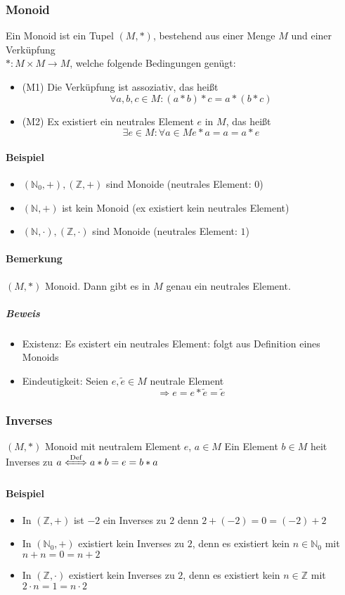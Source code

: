 \documentclass[a4paper]{scrartcl}
\DeclareMathOperator{\Forall}{\forall}
\theoremstyle{definition}
\theoremstyle{plain}
\theoremstyle{plain}
\theoremstyle{remark}
\theoremstyle{remark}
\theoremstyle{remark}
\begin{document}
\subsubsection{Monoid}
\label{sec-3-1-2}
Ein Monoid ist ein Tupel $(M,*)$, bestehend aus einer Menge $M$ und einer Verküpfung \\
    $*:M\times M \to M$, welche folgende Bedingungen genügt:
\begin{itemize}
\item (M1) Die Verküpfung ist assoziativ, das heißt \[\Forall a,b,c\in M:(a*b)*c = a*(b*c) \]
\item (M2) Ex existiert ein neutrales Element $e$ in $M$, das heißt \[\exists e\in M:\Forall a\in M e*a = a = a*e\]
\end{itemize}
\paragraph{Beispiel}
\label{sec-3-1-2-1}
\begin{itemize}
\item $(\mathbb{N}_0,+), (\mathbb{Z},+)$ sind Monoide (neutrales Element: $0$)
\item $(\mathbb{N},+)$ ist kein Monoid (ex existiert kein neutrales Element)
\item $(\mathbb{N},\cdot),(\mathbb{Z},\cdot)$ sind Monoide (neutrales Element: $1$)
\end{itemize}
\paragraph{Bemerkung}
\label{sec-3-1-2-2}
$(M,*)$ Monoid. Dann gibt es in $M$ genau ein neutrales Element.
\subparagraph{Beweis}
\label{sec-3-1-2-2-1}
\begin{itemize}
\item Existenz: Es existert ein neutrales Element: folgt aus Definition eines Monoids
\item Eindeutigkeit: Seien $e,\tilde e \in M$ neutrale Element \[\Rightarrow e = e * \tilde e = \tilde e\]
\end{itemize}
\subsubsection{Inverses}
\label{sec-3-1-3}
$(M,*)$ Monoid mit neutralem Element $e$, $a\in M$
Ein Element $b\in M$ heit Inverses zu $a \xLeftrightarrow{\text{Def}} a * b = e = b * a$
\paragraph{Beispiel}
\label{sec-3-1-3-1}
\begin{itemize}
\item In $(\mathbb{Z},+)$ ist $-2$ ein Inverses zu $2$ denn $2 + (-2) = 0 = (-2) + 2$
\item In $(\mathbb{N}_0,+)$ existiert kein Inverses zu $2$, denn es existiert kein $n\in \mathbb{N}_0$ mit $n + n = 0 = n + 2$
\item \label{invex} In $(\mathbb{Z},\cdot)$ existiert kein Inverses zu $2$, denn es existiert kein $n\in\mathbb{Z}$ mit $2\cdot n = 1 = n \cdot 2$
\end{itemize}
\end{document}
